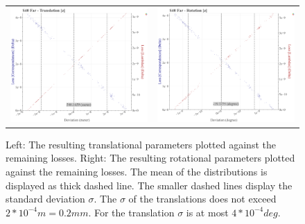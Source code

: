 \begin{figure}[!ht]
\begin{tabular}{cc}
    \includegraphics[width=0.45 \linewidth]{diagrams/calibration/s40_n_far/parameters.csv/Translation[z]_vs_Loss[Correspondences]_vs_Loss[Lambdas]_cluster_All.png} &
    \includegraphics[width=0.45 \linewidth]{diagrams/calibration/s40_n_far/parameters.csv/Rotation[z]_vs_Loss[Correspondences]_vs_Loss[Lambdas]_cluster_All.png} \\
\end{tabular}
\caption{
  Left: The resulting translational parameters plotted against the remaining losses. 
  Right: The resulting rotational parameters plotted against the remaining losses.
  The mean of the distributions is displayed as thick dashed line. The smaller dashed lines display the standard deviation $\sigma$.
  The $\sigma$ of the translations does not exceed $2 * 10^{-4} m = 0.2 mm$.
  For the translation $\sigma$ is at most $4 * 10^{-4} deg$.
  }
\label{fig:static_calibration_algorithmic_error_s40_n_far}
\end{figure}

